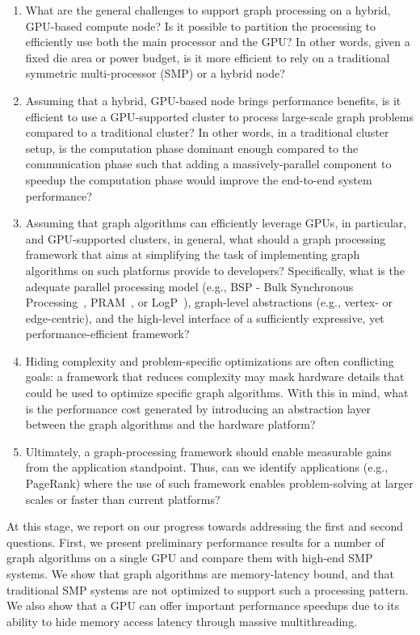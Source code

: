 \begin{enumerate}
\item What are the general challenges to support graph processing on a hybrid, GPU-based compute node? Is it possible to partition the processing to efficiently use both the main processor and the GPU? In other words, given a fixed die area or power budget, is it more efficient to rely on a traditional symmetric multi-processor (SMP) or a hybrid node?

\item Assuming that a hybrid, GPU-based node brings performance benefits, is it efficient to use a GPU-supported cluster to process large-scale graph problems compared to a traditional cluster? In other words, in a traditional cluster setup, is the computation phase dominant enough compared to the communication phase such that adding a massively-parallel component to speedup the computation phase would improve the end-to-end system performance?

\item Assuming that graph algorithms can efficiently leverage GPUs, in particular, and GPU-supported clusters, in general, what should a graph processing framework that aims at simplifying the task of implementing graph algorithms on such platforms provide to developers? Specifically, what is the adequate parallel processing model (e.g., BSP - Bulk Synchronous Processing~\cite{Valiant1990}, PRAM~\cite{Fortune78}, or LogP~\cite{Culler1996}), graph-level abstractions (e.g., vertex- or edge-centric), and the high-level interface of a sufficiently expressive, yet performance-efficient framework?

\item Hiding complexity and problem-specific optimizations are often conflicting goals: a framework that reduces complexity may mask hardware details that could be used to optimize specific graph algorithms. With this in mind, what is the performance cost generated by introducing an abstraction layer between the graph algorithms and the hardware platform?

\item Ultimately, a graph-processing framework should enable measurable gains from the application standpoint. Thus, can we identify applications (e.g., PageRank) where the use of such framework enables problem-solving at larger scales or faster than current platforms?

\end{enumerate}

At this stage, we report on our progress towards addressing the first and second questions. First, we present preliminary performance results for a number of graph algorithms on a single GPU and compare them with high-end SMP systems. We show that graph algorithms are memory-latency bound, and that traditional SMP systems are not optimized to support such a processing pattern. We also show that a GPU can offer important performance speedups due to its ability to hide memory access latency through massive multithreading. 

